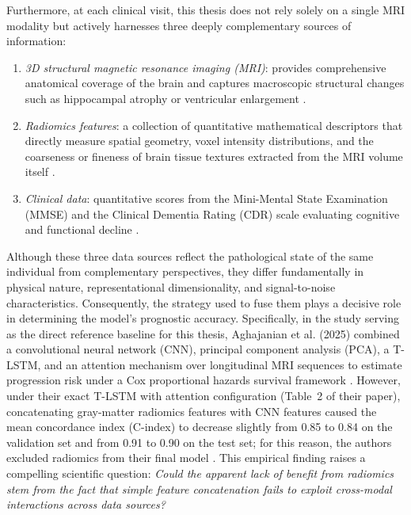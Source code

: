 Furthermore, at each clinical visit, this thesis does not rely solely on a single MRI modality but actively harnesses three deeply complementary sources of information:
\begin{enumerate}
\item \emph{3D structural magnetic resonance imaging (MRI)}: provides comprehensive anatomical coverage of the brain and captures macroscopic structural changes such as hippocampal atrophy or ventricular enlargement \cite{weiner2015impact}.
\item \emph{Radiomics features}: a collection of quantitative mathematical descriptors that directly measure spatial geometry, voxel intensity distributions, and the coarseness or fineness of brain tissue textures extracted from the MRI volume itself \cite{vangriethuysen2017computational}.
\item \emph{Clinical data}: quantitative scores from the Mini-Mental State Examination (MMSE) and the Clinical Dementia Rating (CDR) scale evaluating cognitive and functional decline \cite{folstein1975mmse,morris1993cdr}.
\end{enumerate}

Although these three data sources reflect the pathological state of the same individual from complementary perspectives, they differ fundamentally in physical nature, representational dimensionality, and signal-to-noise characteristics. Consequently, the strategy used to fuse them plays a decisive role in determining the model's prognostic accuracy. Specifically, in the study serving as the direct reference baseline for this thesis, Aghajanian et al. (2025) combined a convolutional neural network (CNN), principal component analysis (PCA), a T-LSTM, and an attention mechanism over longitudinal MRI sequences to estimate progression risk under a Cox proportional hazards survival framework \cite{aghajanian2025longitudinal}. However, under their exact T-LSTM with attention configuration (Table~2 of their paper), concatenating gray-matter radiomics features with CNN features caused the mean concordance index (C-index) to decrease slightly from 0.85 to 0.84 on the validation set and from 0.91 to 0.90 on the test set; for this reason, the authors excluded radiomics from their final model \cite{aghajanian2025longitudinal}. This empirical finding raises a compelling scientific question: \emph{Could the apparent lack of benefit from radiomics stem from the fact that simple feature concatenation fails to exploit cross-modal interactions across data sources?}

